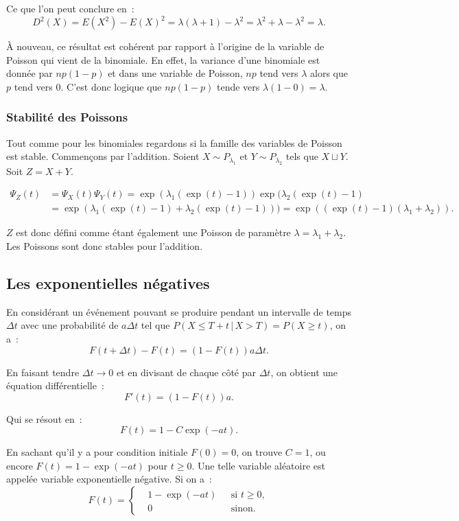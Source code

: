 \documentclass{article}
\begin{document}
			Ce que l'on peut conclure en~:
			\[D^2(X) = E(X^2)-E(X)^2 = \lambda(\lambda+1) - \lambda^2 = \lambda^2 + \lambda - \lambda^2 = \lambda.\]

			À nouveau, ce résultat est cohérent par rapport à l'origine de la variable de Poisson qui vient de la binomiale. En effet, la variance d'une binomiale
			est donnée par $np(1-p)$ et dans une variable de Poisson, $np$ tend vers $\lambda$ alors que $p$ tend vers $0$. C'est donc logique que $np(1-p)$ tende vers
			$\lambda(1-0) = \lambda$.

		\subsubsection{Stabilité des Poissons}
			Tout comme pour les binomiales regardons si la famille des variables de Poisson est stable. Commençons par l'addition. Soient $X \sim P_{\lambda_1}$ et
			$Y \sim P_{\lambda_2}$ tels que $X \sqcup Y$. Soit $Z = X+Y$.

			\begin{align*}
				\Psi_Z(t) &= \Psi_X(t)\Psi_Y(t) = \exp(\lambda_1(\exp(t)-1))\exp(\lambda_2(\exp(t)-1) \\
				&= \exp(\lambda_1(\exp(t)-1) + \lambda_2(\exp(t)-1))) = \exp((\exp(t)-1)(\lambda_1 + \lambda_2)).
			\end{align*}

			$Z$ est donc défini comme étant également une Poisson de paramètre $\lambda = \lambda_1 + \lambda_2$. Les Poissons sont donc stables pour l'addition.

	\subsection{Les exponentielles négatives}
		En considérant un événement pouvant se produire pendant un intervalle de temps $\Delta t$ avec une probabilité de $a\Delta t$ tel que
		$P(X \leq T + t \, | \, X > T) = P(X \geq t)$, on a~:
		\[F(t+\Delta t) - F(t) = (1-F(t))a\Delta t.\]

		En faisant tendre $\Delta t \to 0$ et en divisant de chaque côté par $\Delta t$, on obtient une équation différentielle~:
		\[F'(t) = (1-F(t))a.\]

		Qui se résout en~:
		\[F(t) = 1-C\exp(-at).\]

		En sachant qu'il y a pour condition initiale $F(0) = 0$, on trouve $C = 1$, ou encore $F(t) = 1 - \exp(-at)$ pour $t \geq 0$. Une telle variable aléatoire est
		appelée variable exponentielle négative. Si on a~:
		\[F(t) = \left\{\begin{aligned}
			&1-\exp(-at)\,\, &\text{ si $t \geq 0$}, \\
			& 0 &\text{ sinon}.
		\end{aligned}\right.\]
\end{document}
